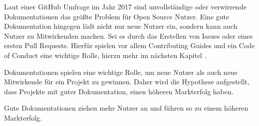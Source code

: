 Laut einer GitHub Umfrage im Jahr 2017 sind unvollständige oder verwirrende Dokumentationen das größte
Problem für Open Source Nutzer. Eine gute Dokumentation hingegen lädt nicht nur neue Nutzer ein,
sondern kann auch Nutzer zu Mitwirkenden machen.
Sei es durch das Erstellen von Issues oder eines ersten Pull Requests.
Hierfür spielen vor allem Contributing Guides und ein Code of Conduct eine wichtige Rolle, hierzu
mehr im nächsten Kapitel \cite{GitHubOpenSourceSurvey2017}.

Dokumentationen spielen eine wichtige Rolle, um neue Nutzer als auch neue Mitwirkende für ein
Projekt zu gewinnen.
Daher wird die Hypothese aufgestellt, dass Projekte mit guter Dokumentation, einen höheren
Markterfolg haben.


\begin{hypothesis}
    Gute Dokumentationen ziehen mehr Nutzer an und führen so zu einem höheren Markterfolg.
    \label{H:3}
\end{hypothesis}